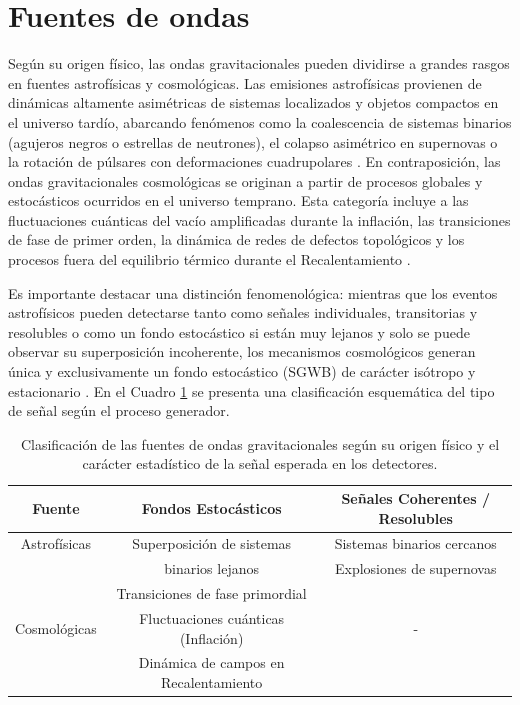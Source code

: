 \section{Fuentes de ondas}

Según su origen físico, las ondas gravitacionales pueden dividirse a grandes rasgos en fuentes astrofísicas y cosmológicas. Las emisiones astrofísicas provienen de dinámicas altamente asimétricas de sistemas localizados y objetos compactos en el universo tardío, abarcando fenómenos como la coalescencia de sistemas binarios (agujeros negros o estrellas de neutrones), el colapso asimétrico en supernovas o la rotación de púlsares con deformaciones cuadrupolares \cite{Maggiore_2018, LIGO}. En contraposición, las ondas gravitacionales cosmológicas se originan a partir de procesos globales y estocásticos ocurridos en el universo temprano. Esta categoría incluye a las fluctuaciones cuánticas del vacío amplificadas durante la inflación, las transiciones de fase de primer orden, la dinámica de redes de defectos topológicos y los procesos fuera del equilibrio térmico durante el Recalentamiento \cite{Caprini_2020, Lozanov}. 

Es importante destacar una distinción fenomenológica: mientras que los eventos astrofísicos pueden detectarse tanto como señales individuales, transitorias y resolubles o como un fondo estocástico si están muy lejanos y solo se puede observar su superposición incoherente, los mecanismos cosmológicos generan única y exclusivamente un fondo estocástico (SGWB) de carácter isótropo y estacionario \cite{Caprini_2020}. En el Cuadro \ref{table:AstrovsCosmo} se presenta una clasificación esquemática del tipo de señal según el proceso generador.

\begin{table}[htbp]
    \centering
    \begin{tabular}{||c||c|c||}
        \hline \hline Fuente & Fondos Estocásticos & Señales Coherentes / Resolubles \\
        \hline \hline 
        Astrofísicas & Superposición de sistemas & Sistemas binarios cercanos\\
        & binarios lejanos & Explosiones de supernovas\\
        \hline & Transiciones de fase primordial & \\
        Cosmológicas & Fluctuaciones cuánticas (Inflación) & - \\
        & Dinámica de campos en Recalentamiento & \\
        \hline \hline
    \end{tabular}
    \caption{Clasificación de las fuentes de ondas gravitacionales según su origen físico y el carácter estadístico de la señal esperada en los detectores.}
    \label{table:AstrovsCosmo}
\end{table}

